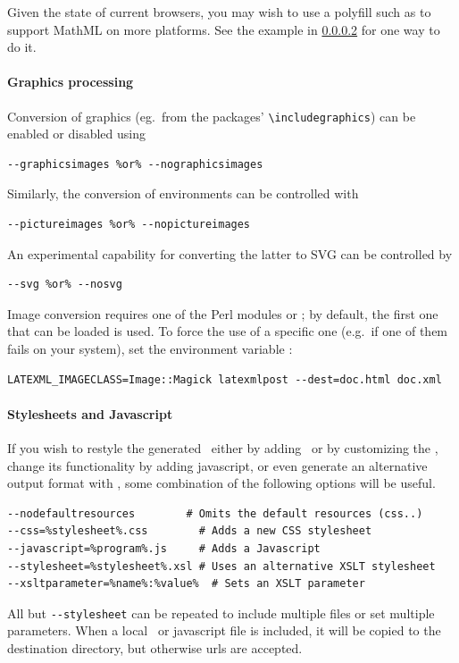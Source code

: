 \documentclass{book}
\newcommand{\shellcode}{\lstinline[style=shell]}
\begin{document}
Given the state of current browsers, you may wish
to use a polyfill such as  
to support MathML on more platforms.
See the example in \ref{usage.post.xslt} for one way to do it.

\paragraph[Graphics]{Graphics processing}\label{usage.post.graphics}
Conversion of graphics (eg.~from the  packages' 
\verb|\includegraphics|) can be enabled or disabled
using
\begin{lstlisting}[style=shell]
--graphicsimages %or% --nographicsimages
\end{lstlisting}
Similarly, the conversion of  environments can be controlled with
\begin{lstlisting}[style=shell]
--pictureimages %or% --nopictureimages
\end{lstlisting}
An experimental capability for converting the latter to \textsc{SVG} can be
controlled by
\begin{lstlisting}[style=shell]
--svg %or% --nosvg
\end{lstlisting}
Image conversion requires one of the Perl modules  or
; by default, the first one that can be loaded is used.
To force the use of a specific one (e.g.~if one of them fails on your system),
set the environment variable :
\begin{lstlisting}[style=shell]
LATEXML_IMAGECLASS=Image::Magick latexmlpost --dest=doc.html doc.xml
\end{lstlisting}

\paragraph{Stylesheets and Javascript}\label{usage.post.xslt}
If you wish to restyle the generated \HTML\ either by adding \CSS\ or by customizing
the \XSLT, change its functionality by adding javascript,
or even generate an alternative output format with \XSLT,
some combination of the following options will be useful.
\begin{lstlisting}[style=shell]
--nodefaultresources        # Omits the default resources (css..)
--css=%stylesheet%.css        # Adds a new CSS stylesheet
--javascript=%program%.js     # Adds a Javascript
--stylesheet=%stylesheet%.xsl # Uses an alternative XSLT stylesheet
--xsltparameter=%name%:%value%  # Sets an XSLT parameter
\end{lstlisting}
All but \shellcode{--stylesheet} can be repeated to include multiple files
or set multiple parameters.  When a local \CSS\ or javascript file is included,
it will be copied to the destination directory, but otherwise urls are accepted.
\end{document}
